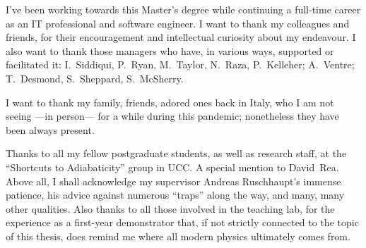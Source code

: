 {
  I've been working towards this Master's degree
  while continuing a full-time career
  as an IT professional and software engineer.
  I want to thank my
  colleagues and friends, for their encouragement
  and intellectual curiosity
  about my endeavour.
  I also want to thank those managers
  who have, in various ways, supported or facilitated it:
  I.~Siddiqui, P.~Ryan, M.~Taylor, N.~Raza, P.~Kelleher;
  A.~Ventre;
  T.~Desmond, S.~Sheppard, S.~McSherry.

  I want to thank my family, friends, adored ones back in Italy,
  who I am not seeing ---in person--- for a while during this pandemic;
  nonetheless they have been always present.

  Thanks to all my fellow postgraduate students,
  as well as research staff,
  at the ``Shortcuts to Adiabaticity'' group in UCC.
  A special mention to David~Rea.
  Above all, I shall acknowledge my supervisor Andreas Ruschhaupt's immense patience,
  his advice against numerous ``traps'' along the way, and many, many other qualities.
  Also thanks to all those involved in the teaching lab, for the experience as a
  first-year demonstrator that,
  if not strictly connected to the topic of this thesis,
  does remind me where all modern physics ultimately comes from.
}
